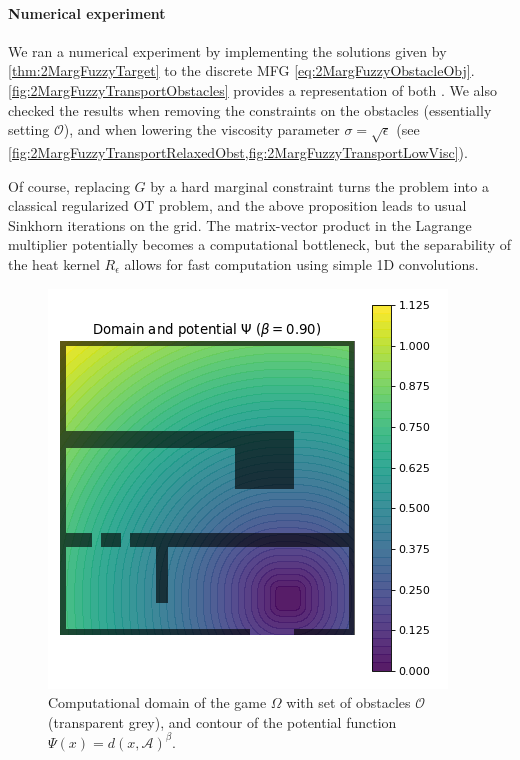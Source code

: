 \documentclass[../report.tex]{subfiles}
\begin{document}
\paragraph{Numerical experiment} We ran a numerical experiment by implementing the solutions given by \cref{thm:2MargFuzzyTarget} to the discrete MFG \eqref{eq:2MargFuzzyObstacleObj}. \cref{fig:2MargFuzzyTransportObstacles} provides a representation of both . We also checked the results when removing the constraints on the obstacles (essentially setting $\mathscr{O}$), and when lowering the viscosity parameter $\sigma = \sqrt{\epsilon}$ (see \cref{fig:2MargFuzzyTransportRelaxedObst,fig:2MargFuzzyTransportLowVisc}).

Of course, replacing $G$ by a hard marginal constraint turns the problem into a classical regularized OT problem, and the above proposition leads to usual Sinkhorn iterations on the grid. The matrix-vector product in the Lagrange multiplier potentially becomes a computational bottleneck, but the separability of the heat kernel $R_\epsilon$ allows for fast computation using simple 1D convolutions.


\begin{figure}
	\centering
	\includegraphics[width=0.5\linewidth]{../project/images/crowd_potential.png}
	\caption{Computational domain of the game $\Omega$ with set of obstacles $\mathscr{O}$ (transparent grey), and contour of the potential function $\Psi(x) = d(x, \mathscr A)^\beta$.} \label{fig:CrowdExamplePotential}	
\end{figure}
\end{document}
